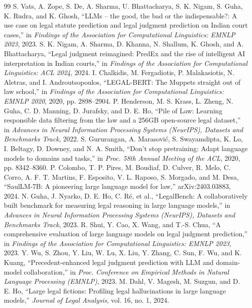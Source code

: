 \begin{thebibliography}{99}
 S. Vats, A. Zope, S. De, A. Sharma, U. Bhattacharya, S. K. Nigam, S. Guha, K. Rudra, and K. Ghosh, ``LLMs -- the good, the bad or the indispensable?: A use case on legal statute prediction and legal judgment prediction on Indian court cases,'' in \emph{Findings of the Association for Computational Linguistics: EMNLP 2023}, 2023.
 S. K. Nigam, A. Sharma, D. Khanna, N. Shallum, K. Ghosh, and A. Bhattacharya, ``Legal judgment reimagined: PredEx and the rise of intelligent AI interpretation in Indian courts,'' in \emph{Findings of the Association for Computational Linguistics: ACL 2024}, 2024.
 I. Chalkidis, M. Fergadiotis, P. Malakasiotis, N. Aletras, and I. Androutsopoulos, ``LEGAL-BERT: The Muppets straight out of law school,'' in \emph{Findings of the Association for Computational Linguistics: EMNLP 2020}, 2020, pp. 2898--2904.
 P. Henderson, M. S. Krass, L. Zheng, N. Guha, C. D. Manning, D. Jurafsky, and D. E. Ho, ``Pile of Law: Learning responsible data filtering from the law and a 256GB open-source legal dataset,'' in \emph{Advances in Neural Information Processing Systems (NeurIPS), Datasets and Benchmarks Track}, 2022.
 S. Gururangan, A. Marasovi\'{c}, S. Swayamdipta, K. Lo, I. Beltagy, D. Downey, and N. A. Smith, ``Don't stop pretraining: Adapt language models to domains and tasks,'' in \emph{Proc. 58th Annual Meeting of the ACL}, 2020, pp. 8342--8360.
 P. Colombo, T. P. Pires, M. Boudiaf, D. Culver, R. Melo, C. Corro, A. F. T. Martins, F. Esposito, V. L. Raposo, S. Morgado, and M. Desa, ``SaulLM-7B: A pioneering large language model for law,'' arXiv:2403.03883, 2024.
 N. Guha, J. Nyarko, D. E. Ho, C. R\'{e}, et al., ``LegalBench: A collaboratively built benchmark for measuring legal reasoning in large language models,'' in \emph{Advances in Neural Information Processing Systems (NeurIPS), Datasets and Benchmarks Track}, 2023.
 R. Shui, Y. Cao, X. Wang, and T.-S. Chua, ``A comprehensive evaluation of large language models on legal judgment prediction,'' in \emph{Findings of the Association for Computational Linguistics: EMNLP 2023}, 2023.
 Y. Wu, S. Zhou, Y. Liu, W. Lu, X. Liu, Y. Zhang, C. Sun, F. Wu, and K. Kuang, ``Precedent-enhanced legal judgment prediction with LLM and domain-model collaboration,'' in \emph{Proc. Conference on Empirical Methods in Natural Language Processing (EMNLP)}, 2023.
 M. Dahl, V. Magesh, M. Suzgun, and D. E. Ho, ``Large legal fictions: Profiling legal hallucinations in large language models,'' \emph{Journal of Legal Analysis}, vol. 16, no. 1, 2024.

\end{thebibliography}
